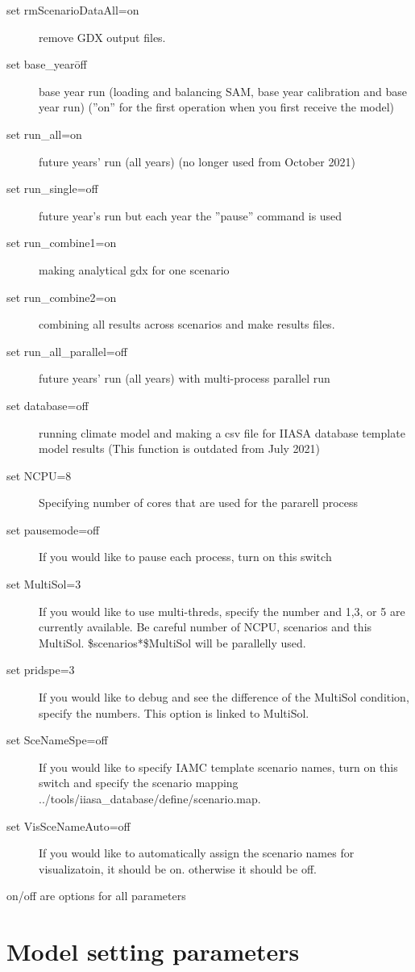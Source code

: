 \documentclass[10pt,a4paper,titlepage,dvipdfmx]{book}
\begin{document}
\begin{description}
\item[set rmScenarioDataAll=on] remove GDX output files.
\item[set base\_year\=off] base year run (loading and balancing SAM, base year calibration and base year run) (''on'' for the first operation when you first receive the model)
\item[set run\_all=on]future years' run (all years) (no longer used from October 2021)
\item[set run\_single=off]future year's run but each year the ''pause'' command is used
\item[set run\_combine1=on]making analytical gdx for one scenario
\item[set run\_combine2=on]combining all results across scenarios and make results files.
\item[set run\_all\_parallel=off]future years' run (all years) with multi-process parallel run
\item[set database=off]running climate model and making a csv file for IIASA database template model results (This function is outdated from July 2021)
\item[set NCPU=8]Specifying number of cores that are used for the pararell process
\item[set pausemode=off]If you would like to pause each process, turn on this switch
\item[set MultiSol=3]If you would like to use multi-threds, specify the number and 1,3, or 5 are currently available. Be careful number of NCPU, scenarios and this MultiSol. \$scenarios*\$MultiSol will be parallelly used. 
\item[set pridspe=3]If you would like to debug and see the difference of the MultiSol condition, specify the numbers. This option is linked to MultiSol. 
\item[set SceNameSpe=off]If you would like to specify IAMC template scenario names, turn on this switch and specify the scenario mapping ../tools/iiasa\_database/define/scenario.map. 
\item[set VisSceNameAuto=off]If you would like to automatically assign the scenario names for visualizatoin, it should be on. otherwise it should be off.

\end{description}
on/off are options for all parameters

\section{\label{sec:ModSetPar}Model setting parameters}
\end{document}
